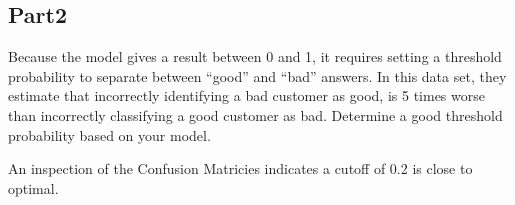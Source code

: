 \documentclass[]{article}
\newenvironment{Shaded}{\begin{snugshade}}{\end{snugshade}}
\newcommand{\ControlFlowTok}[1]{\textcolor[rgb]{0.13,0.29,0.53}{\textbf{#1}}}
\newcommand{\DataTypeTok}[1]{\textcolor[rgb]{0.13,0.29,0.53}{#1}}
\newcommand{\DecValTok}[1]{\textcolor[rgb]{0.00,0.00,0.81}{#1}}
\newcommand{\FloatTok}[1]{\textcolor[rgb]{0.00,0.00,0.81}{#1}}
\newcommand{\KeywordTok}[1]{\textcolor[rgb]{0.13,0.29,0.53}{\textbf{#1}}}
\newcommand{\NormalTok}[1]{#1}
\newcommand{\OperatorTok}[1]{\textcolor[rgb]{0.81,0.36,0.00}{\textbf{#1}}}
\begin{document}
\hypertarget{part2}{%
\subsection{Part2}\label{part2}}

Because the model gives a result between 0 and 1, it requires setting a
threshold probability to separate between ``good'' and ``bad'' answers.
In this data set, they estimate that incorrectly identifying a bad
customer as good, is 5 times worse than incorrectly classifying a good
customer as bad. Determine a good threshold probability based on your
model.

An inspection of the Confusion Matricies indicates a cutoff of 0.2 is
close to optimal.

\begin{Shaded}
\end{Shaded}
\end{document}
